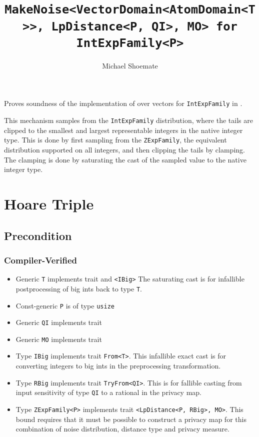 \documentclass{article}
\title{\texttt{MakeNoise<VectorDomain<AtomDomain<T>>, LpDistance<P, QI>, MO> for IntExpFamily<P>}}
\author{Michael Shoemate}
\date{}
\begin{document}
\maketitle

\contrib
Proves soundness of the implementation of  over vectors
for \texttt{IntExpFamily} in .

This mechanism samples from the \texttt{IntExpFamily} distribution, 
where the tails are clipped to the smallest and largest representable integers in the native integer type.
This is done by first sampling from the \texttt{ZExpFamily}, the equivalent distribution supported on all integers,
and then clipping the tails by clamping.
The clamping is done by saturating the cast of the sampled value to the native integer type.

\section{Hoare Triple}
\subsection*{Precondition}
\subsubsection*{Compiler-Verified}

\begin{itemize}
    \item Generic \texttt{T} implements trait  and \texttt{<IBig>}
        The saturating cast is for infallible postprocessing of big ints back to type \texttt{T}.
    \item Const-generic \texttt{P} is of type \texttt{usize}
    \item Generic \texttt{QI} implements trait 
    \item Generic \texttt{MO} implements trait 
    \item Type \texttt{IBig} implements trait \texttt{From<T>}.
        This infallible exact cast is for converting integers to big ints in the preprocessing transformation.
    \item Type \texttt{RBig} implements trait \texttt{TryFrom<QI>}.
        This is for fallible casting from input sensitivity of type \texttt{QI} to a rational in the privacy map.
    \item Type \texttt{ZExpFamily<P>} implements trait \texttt{<LpDistance<P, RBig>, MO>}.
        This bound requires that it must be possible to construct a privacy map for this combination of noise distribution, distance type and privacy measure.
\end{itemize}
\end{document}
